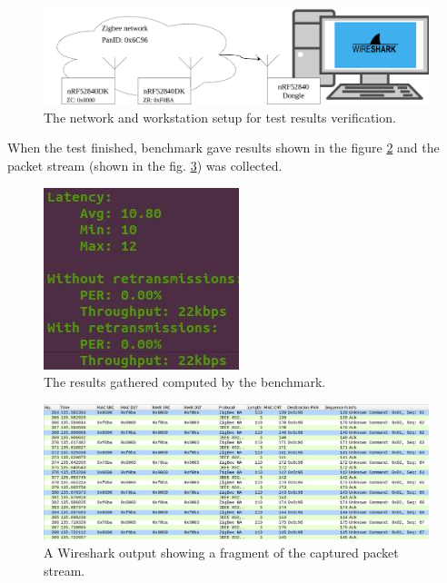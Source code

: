 \begin{figure}[H]
    \centering
    \includegraphics[scale=0.3]{images/verification.png}
    \caption{The network and workstation setup for test results verification.}
    \label{fig:verification}
\end{figure}

When the test finished, benchmark gave results shown in the figure 
\ref{fig:board_results} and the packet stream (shown in the fig. 
\ref{fig:verification_wireshark}) was collected.

\begin{figure}[H]
    \centering
    \includegraphics[scale=0.75]{images/one-hop-w-throughput.jpg}
    \caption{The results gathered computed by the benchmark.}
    \label{fig:board_results}
\end{figure}

\begin{figure}[H]
    \centering
    \includegraphics[scale=0.4]{images/packet-stream.jpg}
    \caption{A Wireshark output showing a fragment of the captured packet stream.}
    \label{fig:verification_wireshark}
\end{figure}

